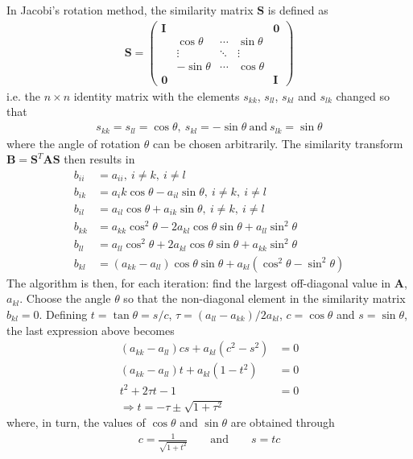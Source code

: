 \documentclass[11pt, a4paper]{article}
\newcommand{\A}{\mathbf{A}}
\renewcommand{\S}{\mathbf{S}}
\newcommand{\B}{\mathbf{B}}
\begin{document}
			In Jacobi's rotation method, the similarity matrix $\S$ is defined as
			\begin{align*}
				\S = \begin{pmatrix} \mathbf{ I } &  &  &  & \mathbf{ 0 } \\  & \cos  \theta  & \cdots  & \sin  \theta  &  \\  & \vdots & \ddots  & \vdots  &  \\  & -\sin  \theta  & \cdots  & \cos  \theta  &  \\ \mathbf{ 0 } &  &  &  & \mathbf{ I } \end{pmatrix}
			\end{align*}
			i.e.  the $n\times n$ identity matrix with the elements $s_{kk}$, $s_{ll}$, $s_{kl}$ and $s_{lk}$ changed so that
			\begin{align*}
				s_{kk} = s_{ll} = \cos\theta, \ s_{kl} = -\sin\theta \ \mathrm{and} \ s_{lk} = \sin\theta
			\end{align*}
			where the angle of rotation $\theta$ can be chosen arbitrarily.
			The similarity transform $\B=\S^T\A\S$ then results in 
			\begin{align*}
				b_{ii} 	&= a_{ii}, \ i \neq k, \ i \neq l \\
				b_{ik} 	&= a_ik\cos \theta - a_{il}\sin\theta,\ i \neq k, \ i \neq l \\
				b_{il} 	&= a_{il} \cos\theta + a_{ik}\sin\theta, \ i \neq k, \ i \neq l \\
				b_{kk} 	&= a_{kk}\cos^2\theta - 2a_{kl}\cos\theta \sin\theta + a_{ll}\sin^2\theta \\
				b_{ll} 	&= a_{ll}\cos^2\theta +2a_{kl}\cos\theta\sin\theta + a_{kk}\sin^2\theta \\
				b_{kl} 	&= (a_{kk} - a_{ll})\cos\theta \sin\theta +a_{kl}(\cos^2\theta - \sin^2\theta)
			\end{align*}
			The algorithm is then, for each iteration: find the largest off-diagonal value in $\A$, $a_{kl}$. Choose the angle $\theta$ so that the non-diagonal element in the similarity matrix $b_{kl}=0$. Defining $t=\tan\theta = s/c$, $\tau=(a_{ll}-a_{kk})/2a_{kl}$, $c=\cos \theta$ and $s=\sin \theta$, the last expression above becomes 
			\begin{align*}
				(a_{kk} - a_{ll})c s +a_{kl}(c^2 - s^2) 	&= 0 \\
				 (a_{kk} - a_{ll})t + a_{kl}(1-t^2)				&= 0 \\
				 t^2 + 2\tau t - 1 &= 0 \\
				 \Rightarrow t = -\tau \pm \sqrt{1+\tau^2}
			\end{align*}
			where, in turn, the values of $\cos \theta$ and $\sin \theta$ are obtained through
			\begin{align*}
				c = \frac{1}{\sqrt{1+t^2}} \qquad \mathrm{and} \qquad s = tc
			\end{align*}
			
\end{document}
